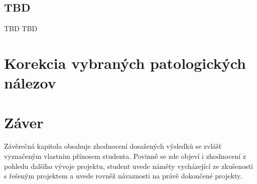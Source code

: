 \section{TBD}
TBD\cite{sec}
TBD\cite{bio}

\chapter{Korekcia vybraných patologických nálezov}


\chapter{Záver}
Závěrečná kapitola obsahuje zhodnocení dosažených výsledků se zvlášť vyznačeným vlastním přínosem studenta. Povinně se zde objeví i zhodnocení z pohledu dalšího vývoje projektu, student uvede náměty vycházející ze zkušeností s řešeným projektem a uvede rovněž návaznosti na právě dokončené projekty.

